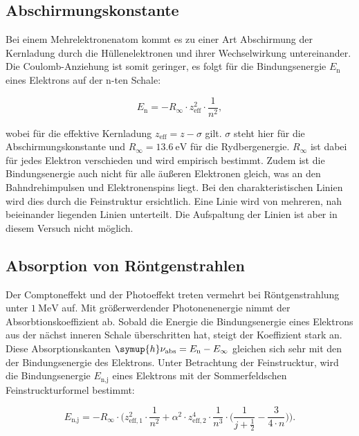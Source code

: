 \subsection{Abschirmungskonstante}
\label{subsec:Abschirmungskonstante}

Bei einem Mehrelektronenatom kommt es zu einer Art Abschirmung der Kernladung durch die Hüllenelektronen und ihrer Wechselwirkung untereinander.
Die Coulomb-Anziehung ist somit geringer, es folgt für die Bindungsenergie $E_\text{n}$ eines Elektrons auf der n-ten Schale:

\begin{equation*}
    E_\text{n} = -R_{\infty} \cdot z^2_\text{eff} \cdot \frac{1}{n^2},
\end{equation*}

wobei für die effektive Kernladung $z_\text{eff} = z - \sigma$ gilt.
$\sigma$ steht hier für die Abschirmungskonstante und $R_\infty = \SI{13.6}{\electronvolt}$ für die Rydbergenergie.
$R_\infty$ ist dabei für jedes Elektron verschieden und wird empirisch bestimmt.
Zudem ist die Bindungsenergie auch nicht für alle äußeren Elektronen gleich, was an den Bahndrehimpulsen und Elektronenspins liegt.
Bei den charakteristischen Linien wird dies durch die Feinstruktur ersichtlich.
Eine Linie wird von mehreren, nah beieinander liegenden Linien unterteilt.
Die Aufspaltung der Linien ist aber in diesem Versuch nicht möglich.

\subsection{Absorption von Röntgenstrahlen}
\label{Absorption}

Der Comptoneffekt und der Photoeffekt treten vermehrt bei Röntgenstrahlung unter $\SI{1}{\mega\electronvolt}$ auf.
Mit größerwerdender Photonenenergie nimmt der Absorbtionskoeffizient ab.
Sobald die Energie die Bindungsenergie eines Elektrons aus der nächst inneren Schale überschritten hat, steigt der Koeffizient stark an.
Diese Absorptionskanten $\symup{h} \nu_\text{abs} = E_\text{n} - E_\infty$ gleichen sich sehr mit den der Bindungsenergie des Elektrons.
Unter Betrachtung der Feinstrucktur, wird die Bindungsenergie $E_\text{n,j}$ eines Elektrons mit der Sommerfeldschen Feinstruckturformel bestimmt:

\begin{equation}
    \label{eqn:sommerfeld}
    E_\text{n,j} = -R_\infty \cdot \Biggl( z^2_{\text{eff},1} \cdot \frac{1}{n^2} + \alpha^2 \cdot z^4_{\text{eff},2} \cdot \frac{1}{n^3} \cdot \Biggl(\frac{1}{j + \frac{1}{2}} - \frac{3}{4 \cdot n} \Biggr)\Biggr).
\end{equation}

